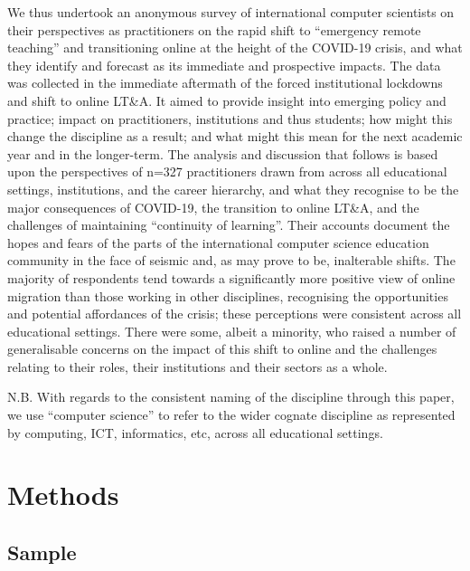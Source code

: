\documentclass[sigconf]{acmart}
\begin{document}
We thus undertook an anonymous survey of international computer
scientists on their perspectives as practitioners on the rapid shift
to ``emergency remote teaching'' and transitioning online at the
height of the COVID-19 crisis, and what they identify and forecast as
its immediate and prospective impacts. The data was collected in the
immediate aftermath of the forced institutional lockdowns and shift to
online LT\&A. It aimed to provide insight into emerging policy and
practice; impact on practitioners, institutions and thus students; how
might this change the discipline as a result; and what might this mean
for the next academic year and in the longer-term.  The analysis and
discussion that follows is based upon the perspectives of n=327
practitioners drawn from across all educational settings,
institutions, and the career hierarchy, and what they recognise to be
the major consequences of COVID-19, the transition to online LT\&A,
and the challenges of maintaining ``continuity of learning''. Their
accounts document the hopes and fears of the parts of the
international computer science education community in the face of
seismic and, as may prove to be, inalterable shifts. The majority of
respondents tend towards a significantly more positive view of online
migration than those working in other disciplines, recognising the
opportunities and potential affordances of the crisis; these
perceptions were consistent across all educational settings. There
were some, albeit a minority, who raised a number of generalisable
concerns on the impact of this shift to online and the challenges
relating to their roles, their institutions and their sectors as a
whole.


N.B. With regards to the consistent naming of the discipline through this
paper, we use ``computer science'' to refer to the wider cognate
discipline as represented by computing, ICT, informatics, etc, across
all educational settings.

\section{Methods}\label{methods}

\subsection{Sample}
\end{document}
